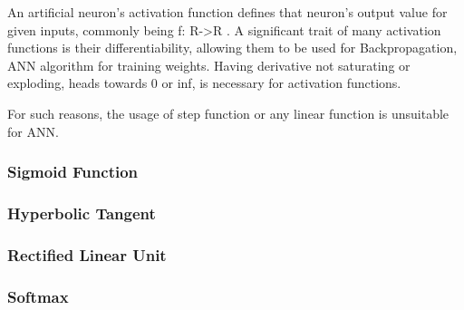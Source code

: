 An artificial neuron's activation function defines that neuron's output value
 for given inputs, commonly being f: R->R \cite{leskovec2020mining}. A significant trait of many activation functions is their differentiability, allowing them to be used for Backpropagation, ANN algorithm for training weights. Having derivative not saturating or exploding, heads towards 0 or inf, is necessary for activation functions.

For such reasons, the usage of step function or any linear function is unsuitable for ANN.

\subsubsection{Sigmoid Function}

\subsubsection{Hyperbolic Tangent}

\subsubsection{Rectified Linear Unit}

\subsubsection{Softmax}

